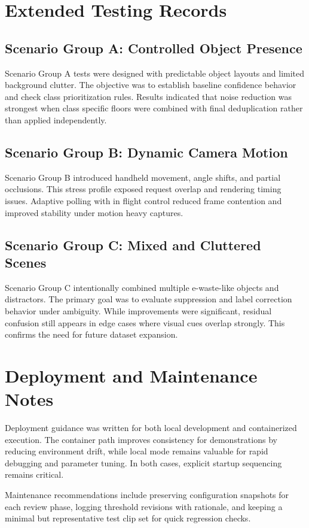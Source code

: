 \documentclass[12pt,a4paper]{report}
\begin{document}
\section{Extended Testing Records}
\subsection{Scenario Group A: Controlled Object Presence}
Scenario Group A tests were designed with predictable object layouts and limited background clutter. The objective was to establish baseline confidence behavior and check class prioritization rules. Results indicated that noise reduction was strongest when class specific floors were combined with final deduplication rather than applied independently.

\subsection{Scenario Group B: Dynamic Camera Motion}
Scenario Group B introduced handheld movement, angle shifts, and partial occlusions. This stress profile exposed request overlap and rendering timing issues. Adaptive polling with in flight control reduced frame contention and improved stability under motion heavy captures.

\subsection{Scenario Group C: Mixed and Cluttered Scenes}
Scenario Group C intentionally combined multiple e-waste-like objects and distractors. The primary goal was to evaluate suppression and label correction behavior under ambiguity. While improvements were significant, residual confusion still appears in edge cases where visual cues overlap strongly. This confirms the need for future dataset expansion.

\section{Deployment and Maintenance Notes}
Deployment guidance was written for both local development and containerized execution. The container path improves consistency for demonstrations by reducing environment drift, while local mode remains valuable for rapid debugging and parameter tuning. In both cases, explicit startup sequencing remains critical.

Maintenance recommendations include preserving configuration snapshots for each review phase, logging threshold revisions with rationale, and keeping a minimal but representative test clip set for quick regression checks.
\end{document}
